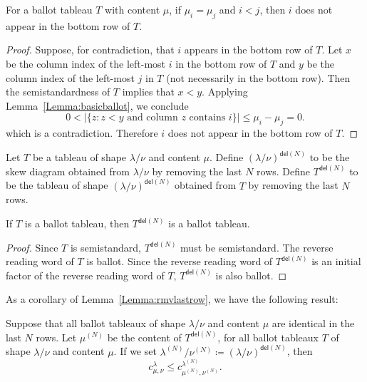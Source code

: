 \documentclass[ALCO,ThmDefs,Unicode,epreuves]{cedram}
\newcommand{\del}{\mathsf{del}}
\begin{document}
\begin{lemma}\label{Lemma:rowofT}
For a ballot tableau $T$ with content $\mu$, if $\mu_i= \mu_j$ and $i<j$, then $i$ does not appear in the bottom row of $T$.
\end{lemma}
\begin{proof}
Suppose, for contradiction, that $i$ appears in the bottom row of $T$. Let $x$ be the column index of the left-most $i$ in the bottom row of $T$ and $y$ be the column index of the left-most $j$ in $T$ (not necessarily in the bottom row). Then the semistandardness of $T$ implies that $x<y$. Applying Lemma~\ref{Lemma:basicballot}, we conclude
\[ 
0 < |\{ z : z < y\text{ and column $z$ contains $i$} \}| \leq \mu_i-\mu_j = 0.
\]
which is a contradiction. Therefore $i$ does not appear in the bottom row of $T$.
\end{proof}

\begin{defi} \label{def:skewbottomrowremoval} Let $T$ be a tableau of shape $\lambda / \nu$ and content $\mu$. Define $(\lambda/\nu)^{\del(N)}$ to be the skew diagram obtained from $\lambda/\nu$ by removing the last $N$ rows. Define $T^{\del (N)}$ to be the tableau of shape $(\lambda/\nu)^{\del (N)}$ obtained from $T$ by removing the last $N$ rows. 
\end{defi} 
\begin{lemma}\label{Lemma:rmvlastrow}
If $T$ is a ballot tableau, then $T^{\del (N)}$ is a ballot tableau. 
\end{lemma}
\begin{proof}
Since $T$ is semistandard, $T^{\del (N)}$ must be semistandard. The reverse reading word of $T$ is ballot. Since the reverse reading word of $T^{\del (N)}$ is an initial factor of the reverse reading word of $T$, $T^{\del (N)}$ is also ballot.
\end{proof}

As a corollary of Lemma~\ref{Lemma:rmvlastrow}, we have the following result:

\begin{coro}\label{Cor:rmvlastrow}
Suppose that all ballot tableaux of shape $\lambda/\nu$ and content $\mu$ are identical in the last $N$ rows. Let $\mu^{(N)}$ be the content of $T^{\del (N)}$, for all ballot tableaux $T$ of shape $\lambda/\nu$ and content $\mu$. If we set $\lambda^{(N)}/\nu^{(N)} \coloneqq (\lambda/\nu)^{\del (N)}$, then
\[
c^{\lambda}_{\mu,\nu}\leq c^{\lambda^{(N)}}_{\mu^{(N)},\nu^{(N)}}.
\]

\end{coro}
\end{document}
